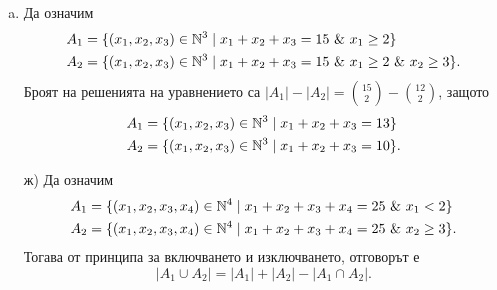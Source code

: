 \begin{hint}
\begin{enumerate}[a)]
  \item
    Да означим
    \begin{align*}
      A_1 & = \{(x_1,x_2,x_3)\in\Nat^3 \mid x_1+x_2+x_3 = 15\ \&\ x_1 \geq 2\}\\
      A_2 & = \{(x_1,x_2,x_3)\in\Nat^3 \mid x_1+x_2+x_3 = 15\ \&\ x_1 \geq 2\ \&\ x_2 \geq 3\}.
    \end{align*}
    Броят на решенията на уравнението са $|A_1| - |A_2| = \binom{15}{2} - \binom{12}{2}$, защото
    \begin{align*}
      A_1 & = \{(x_1,x_2,x_3)\in\mathbb{N}^3 \mid x_1+x_2+x_3 = 13\}\\
      A_2 & = \{(x_1,x_2,x_3)\in\mathbb{N}^3 \mid x_1+x_2+x_3 = 10\}.
    \end{align*}
  \item[ж)]
    Да означим
    \begin{align*}
      A_1 & = \{(x_1,x_2,x_3,x_4)\in\mathbb{N}^4 \mid x_1+x_2+x_3+x_4 = 25\ \&\ x_1 < 2\}\\
      A_2 & = \{(x_1,x_2,x_3,x_4)\in\mathbb{N}^4 \mid x_1+x_2+x_3+x_4 = 25\ \&\ x_2 \geq 3\}.
    \end{align*}
    Тогава от принципа за включването и изключването, отговорът е 
    \[|A_1 \cup A_2| = |A_1| + |A_2| - |A_1 \cap A_2|.\]
  \end{enumerate}
\end{hint}



